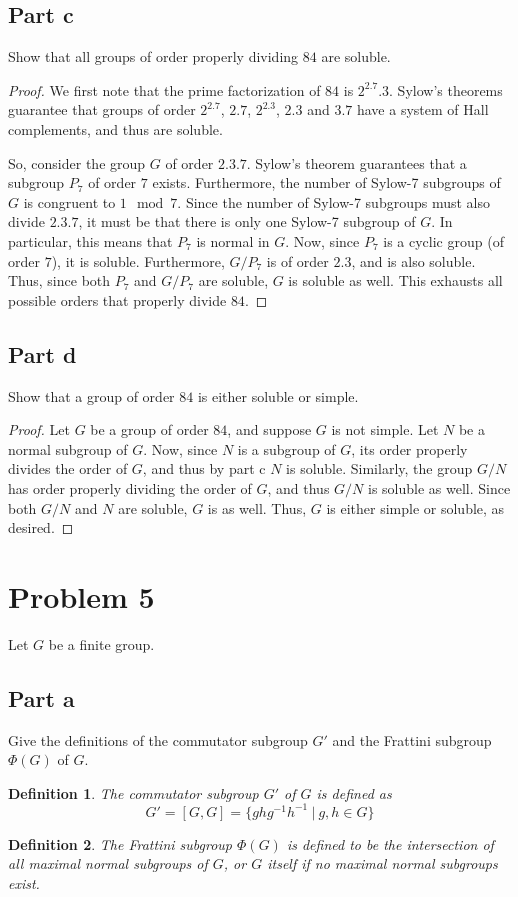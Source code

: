 \documentclass[12pt,reqno]{amsart}
\newtheorem*{definition}{Definition}
\begin{document}
\subsection*{Part c}
Show that all groups of order properly dividing $84$ are soluble.
\\
\begin{proof}
We first note that the prime factorization of $84$ is $2^2.7.3$. Sylow's
    theorems guarantee that groups of order $2^2.7$, $2.7$, $2^2.3$, $2.3$ and
    $3.7$ have a system of Hall complements, and thus are soluble.

    So, consider the group $G$ of order $2.3.7$. Sylow's theorem guarantees that a
    subgroup $P_7$ of order $7$ exists. Furthermore, the number of Sylow-7
    subgroups of $G$ is congruent to $1\mod 7$. Since the
    number of Sylow-7 subgroups must also divide $2.3.7$, it must be that there
    is only one Sylow-7 subgroup of $G$. In particular,
    this means that $P_7$ is normal in $G$. Now, since $P_7$ is a cyclic group
    (of order $7$), it is soluble. Furthermore, $G/{P_7}$ is of order $2.3$, and
    is also soluble. Thus, since both $P_7$ and $G/{P_7}$ are soluble, $G$ is
    soluble as well.
    This exhausts all possible orders that properly divide $84$. 
\end{proof}

\subsection*{Part d}
Show that a group of order $84$ is either soluble or simple.
\\
\begin{proof}
    Let $G$ be a group of order $84$, and suppose $G$ is not simple. Let $N$ be
    a normal subgroup of $G$. Now, since $N$ is a subgroup of $G$, its order
    properly divides the order of $G$, and thus by part c $N$ is soluble.
    Similarly, the group $G/N$ has order properly dividing the order of $G$, and
    thus $G/N$ is soluble as well. Since both $G/N$ and $N$ are soluble, $G$ is
    as well. Thus, $G$ is either simple or soluble, as desired.
\end{proof}

\section*{Problem 5}
Let $G$ be a finite group.
\subsection*{Part a}
Give the definitions of the commutator subgroup $G'$ and the Frattini subgroup
$\Phi(G)$ of $G$.
\begin{definition}
    The commutator subgroup $G'$ of $G$ is defined as
    \[
        G' = [G,G] = \{ghg^{-1}h^{-1}\ |\ g,h\in G\}
    \]
\end{definition}
\begin{definition}
    The Frattini subgroup $\Phi(G)$ is defined to be the intersection of all
    maximal normal subgroups of $G$, or $G$ itself if no maximal normal
    subgroups exist.
\end{definition}
\end{document}
